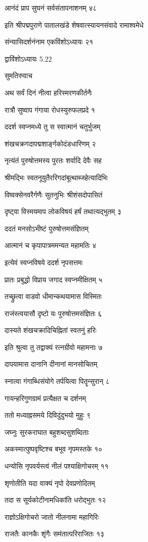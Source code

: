 आनंदं प्राप सुघनं सर्वसंतापनाशनम् ४८

इति श्रीपद्मपुराणे पातालखंडे शेषवात्स्यायनसंवादे रामाश्वमेधे

संन्यासिदर्शनंनाम एकविंशोऽध्यायः २१

द्वाविंशोऽध्यायः 5.22

सुमतिरुवाच

अथ सर्वं दिनं नीत्वा हरिस्मरणकीर्तनैः

रात्रौ सुष्वाप गंगाया रोधस्युरुफलप्रदे १

ददर्श स्वप्नमध्ये तु स स्वात्मानं चतुर्भुजम्

शंखचक्रगदापद्मशार्ङ्गकोदंडधारिणम् २

नृत्यंतं पुरुषोत्तमस्य पुरतः शर्वादि देवैः सह

श्रीमद्भिः स्वतनूयुतैररिगदांबूत्थाब्जहेत्यादिभिः

विष्वक्सेनवरैर्गणैः सुतनुभिः श्रीशंसदोपासितं

दृष्ट्वा विस्मयमाप लोकविषयं हर्षं तथात्यद्भुतम् ३

ददतं मनसोऽभीष्टं पुरुषोत्तमसंज्ञितम्

आत्मानं च कृपापात्रममन्यत महामतिः ४

इत्येवं स्वप्नविषये ददर्श नृपसत्तमः

प्रातः प्रबुद्धो विप्राय जगाद स्वप्नमीक्षितम् ५

तच्छ्रुत्वा वाडवो धीमान्कथयामास विस्मितः

राजंस्त्वयासौ दृष्टो यः पुरुषोत्तमसंज्ञितः ६

दास्यते शंखचक्रादिचिह्नितां स्वतनुं हरिः

इति श्रुत्वा तु तद्वाक्यं रत्नग्रीवो महामनाः ७

दापयामास दानानि दीनानां मानसोचितम्

स्नात्वा गंगाब्धिसंयोगे तर्पयित्वा पितॄन्सुरान् ८

गायन्हरिगुणग्रामं प्रत्यैक्षत च दर्शनम्

ततो मध्याह्नसमये दिविदुंदुभयो मुहुः ९

जघ्नुः सुरकराघात बहुशब्दसुशब्दिताः

अकस्मात्पुष्पवृष्टिश्च बभूव नृपमस्तके १०

धन्योसि नृपवर्यस्त्वं नीलं पश्याक्षिगोचरम् ११

शृणोतीति यदा वाक्यं नृपो देवप्रणोदितम्

तदा स सूर्यकोटीनामधिकांति धरोद्भुतः १२

राज्ञोऽक्षिगोचरो जातो नीलनामा महागिरिः

राजतैः कानकैः शृंगैः समंतात्परिराजितः १३

